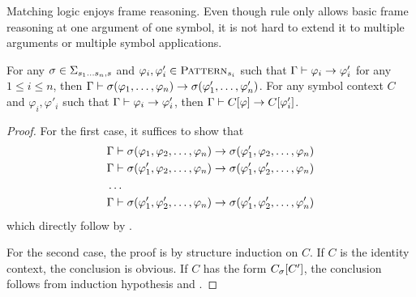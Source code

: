 \documentclass{amsart}
\begin{document}
Matching logic enjoys frame reasoning.
Even though rule \framing only allows basic frame reasoning
at one argument of one symbol, 
it is not hard to extend it to multiple arguments
or multiple symbol applications.

\begin{proposition}
	\label{prop_framing}
For any $\sigma \in \Sigma_{s_1 \dots s_n , s}$ and 
$\varphi_i, \varphi'_i \in \textnormal{\textsc{Pattern}}_{s_i}$
such that $\Gamma \vdash \varphi_i \to \varphi'_i$
for any $1 \le i \le n$,
then $\Gamma \vdash 
\sigma(\varphi_1 ,\dots, \varphi_n) \to
\sigma(\varphi'_1 ,\dots, \varphi'_n)$.
For any symbol context $C$ and $\varphi_i, \varphi'_i$ such that
$\Gamma \vdash \varphi_i \to \varphi'_i$,
then $\Gamma \vdash C[\varphi] \to C[\varphi'_i]$.
\end{proposition}
\begin{proof}
For the first case,
it suffices to show that
\begin{align*}
&\Gamma \vdash \sigma(\varphi_1 , \varphi_2 ,\dots, \varphi_n)
          \to \sigma(\varphi'_1, \varphi_2 ,\dots, \varphi_n) \\
&\Gamma \vdash \sigma(\varphi'_1 , \varphi_2 ,\dots, \varphi_n)
          \to \sigma(\varphi'_1, \varphi'_2 ,\dots, \varphi_n) \\
& \dots \\
&\Gamma \vdash \sigma(\varphi'_1 , \varphi'_2 ,\dots, \varphi_n)
          \to \sigma(\varphi'_1, \varphi'_2 ,\dots, \varphi'_n) \\
\end{align*}
which directly follow by \framing.

For the second case,
the proof is by structure induction on $C$.
If $C$ is the identity context, the conclusion is obvious.
If $C$ has the form $C_{\sigma}[C']$, the conclusion follows from
induction hypothesis and \framing.
\end{proof}
\end{document}
